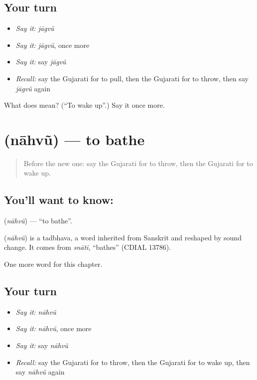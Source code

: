 \subsection*{Your turn}
\begin{itemize}
\raggedright
  \item \emph{Say it:} \emph{jāgvũ}
  \item \emph{Say it:} \emph{jāgvũ}, once more
  \item \emph{Say it:} say \emph{jāgvũ}
  \item \emph{Recall:} say the Gujarati for to pull, then the Gujarati for to throw, then say \emph{jāgvũ} again
\end{itemize}

\begin{tcolorbox}[breakable,colback=teal!4,colframe=teal!35!black,title={Before you move on}]
What does  mean? (\textquotedblleft{}To wake up\textquotedblright{}.) Say it once more.
\end{tcolorbox}
\section[\texorpdfstring{\gu{નાહવું} (nāhvũ)}{નાહવું (nāhvũ)}]{ (nāhvũ) — to bathe}

\label{lesson:GU-C141-nahvu}



\begin{quote}
Before the new one: say the Gujarati for to throw, then the Gujarati for to wake up.
\end{quote}

\subsection*{You'll want to know: }
\textbf{} (\emph{nāhvũ}) — \textquotedblleft{}to bathe\textquotedblright{}.

\begin{cousinweb}
\textbf{} (\emph{nāhvũ}) is a tadbhava, a word inherited from Sanskrit and reshaped by sound change. It comes from \emph{snāti}, \textquotedblleft{}bathes\textquotedblright{} (CDIAL 13786).
\end{cousinweb}

\begin{grammarlens}[title={What you've built}]
One more word for this chapter.
\end{grammarlens}

\subsection*{Your turn}
\begin{itemize}
\raggedright
  \item \emph{Say it:} \emph{nāhvũ}
  \item \emph{Say it:} \emph{nāhvũ}, once more
  \item \emph{Say it:} say \emph{nāhvũ}
  \item \emph{Recall:} say the Gujarati for to throw, then the Gujarati for to wake up, then say \emph{nāhvũ} again
\end{itemize}

